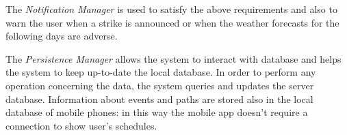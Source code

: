 The \textit{Notification Manager} is used to satisfy the above requirements and also to warn the user when a strike is announced or when the weather forecasts for the following days are adverse.

The \textit{Persistence Manager} allows the system to interact with database and helps the system to keep up-to-date the local database. In order to perform any operation concerning the data, the system queries and updates the server database. Information about events and paths are stored also in the local database of mobile phones: in this way the mobile app doesn't require a connection to show user's schedules. 